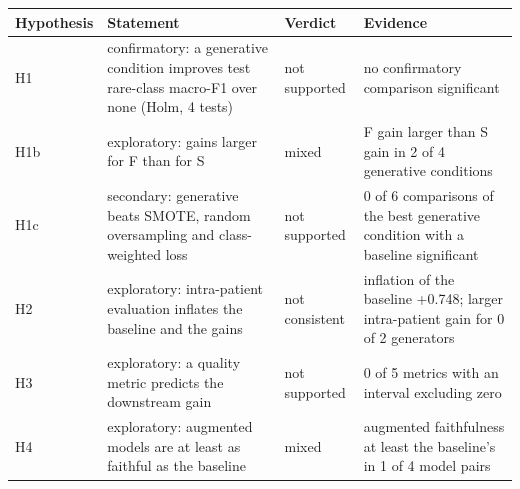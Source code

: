 \begin{tabular}{lp{5.2cm}lp{5.2cm}}
\toprule
Hypothesis & Statement & Verdict & Evidence \\
\midrule
H1 & confirmatory: a generative condition improves test rare-class macro-F1 over none (Holm, 4 tests) & not supported & no confirmatory comparison significant \\
H1b & exploratory: gains larger for F than for S & mixed & F gain larger than S gain in 2 of 4 generative conditions \\
H1c & secondary: generative beats SMOTE, random oversampling and class-weighted loss & not supported & 0 of 6 comparisons of the best generative condition with a baseline significant \\
H2 & exploratory: intra-patient evaluation inflates the baseline and the gains & not consistent & inflation of the baseline +0.748; larger intra-patient gain for 0 of 2 generators \\
H3 & exploratory: a quality metric predicts the downstream gain & not supported & 0 of 5 metrics with an interval excluding zero \\
H4 & exploratory: augmented models are at least as faithful as the baseline & mixed & augmented faithfulness at least the baseline's in 1 of 4 model pairs \\
\bottomrule
\end{tabular}
